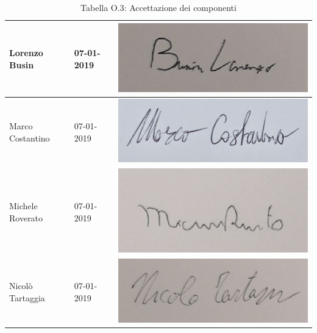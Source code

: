 \begin{table}[H]
\begin{center}
\begin{tabular}{| M{3cm} | M{3cm} | M{6cm} |}
    Lorenzo Busin & 07-01-2019 & \includegraphics[scale=0.25]{Res/Firme/lorenzo.jpg} \\ \hline
    Marco Costantino & 07-01-2019 & \includegraphics[scale=0.35]{Res/Firme/marco.png} \\ \hline
    Michele Roverato & 07-01-2019 & \includegraphics[scale=0.25]{Res/Firme/michele.jpg} \\ \hline
    Nicolò Tartaggia & 07-01-2019 & \includegraphics[scale=0.25]{Res/Firme/tartizz.jpg} \\ 
    \hline
  \end{tabular}
  \caption{Tabella O.3: Accettazione dei componenti\label{}}
\end{center}
\end{table}
\renewcommand{\arraystretch}{1}

